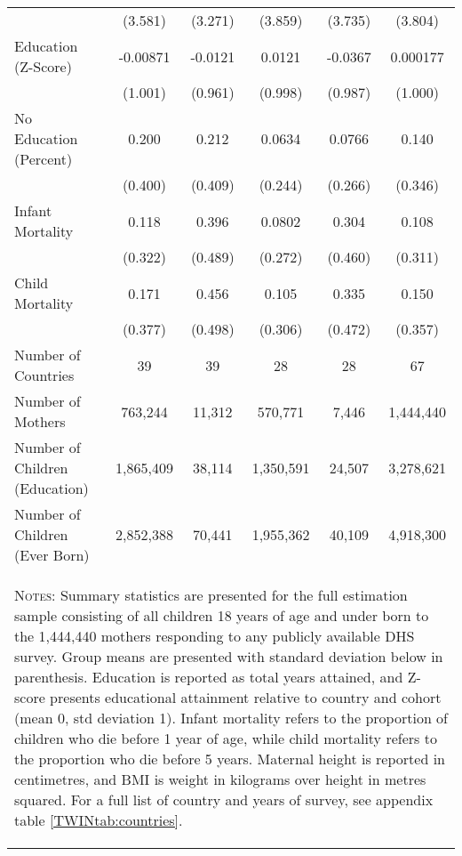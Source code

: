 \begin{table}[htpb!]
\begin{center}
{\begin{tabular}{lccccc}
&(3.581)&(3.271)&(3.859)&(3.735)&(3.804)\\
Education (Z-Score)&-0.00871&-0.0121&0.0121&-0.0367&0.000177\\
&(1.001)&(0.961)&(0.998)&(0.987)&(1.000)\\
No Education (Percent)&0.200&0.212&0.0634&0.0766&0.140\\
&(0.400)&(0.409)&(0.244)&(0.266)&(0.346)\\
Infant Mortality&0.118&0.396&0.0802&0.304&0.108\\
&(0.322)&(0.489)&(0.272)&(0.460)&(0.311)\\
Child Mortality&0.171&0.456&0.105&0.335&0.150\\
&(0.377)&(0.498)&(0.306)&(0.472)&(0.357)\\
\midrule
Number of Countries & 39&39  & 28&28  & 67 \\
Number of Mothers &763,244 &11,312 &570,771 &7,446 & 1,444,440 \\
Number of Children (Education) &1,865,409 &38,114 &1,350,591 &24,507 & 3,278,621 \\
Number of Children (Ever Born) &2,852,388 &70,441 &1,955,362 &40,109 & 4,918,300 \\
\midrule
\multicolumn{6}{p{13.8cm}}{\begin{footnotesize}\textsc{Notes:} Summary statistics are presented for the full estimation  sample consisting of all children 18 years of age and under born to the 1,444,440
 mothers responding to any publicly available DHS survey. Group means are presented with standard deviation below in parenthesis.  Education is reported as total years attained, and Z-score presents educational attainment relative to country and cohort (mean 0, std deviation 1).  Infant mortality refers to the proportion of children who die before 1 year of age,  while child mortality refers to the proportion who die before 5 years.  Maternal height is reported in centimetres, and BMI is weight in kilograms over height in metres squared.  For a full list of country and years of survey, see appendix table \ref{TWINtab:countries}.\end{footnotesize}} \\ \bottomrule \end{tabular}}\end{center}\end{table}